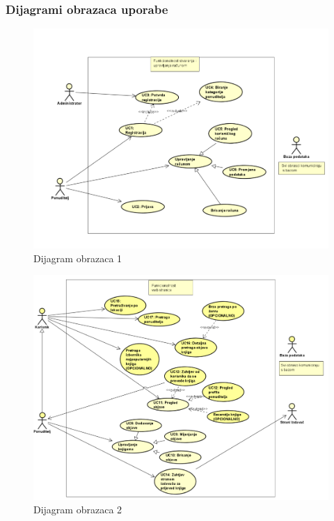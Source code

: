 				\subsubsection{Dijagrami obrazaca uporabe}
					


\begin{figure}
    \centering
    \includegraphics[width = \textwidth]{slike/DO1}
    \caption{Dijagram obrazaca 1}
    \label{fig:Dijagram obrazaca 1}
\end{figure}



\begin{figure}
    \centering
    \includegraphics[width = \textwidth]{slike/DO2}
    \caption{Dijagram obrazaca 2}
    \label{fig:Dijagram obrazaca 2}
\end{figure}
				\eject	
					

